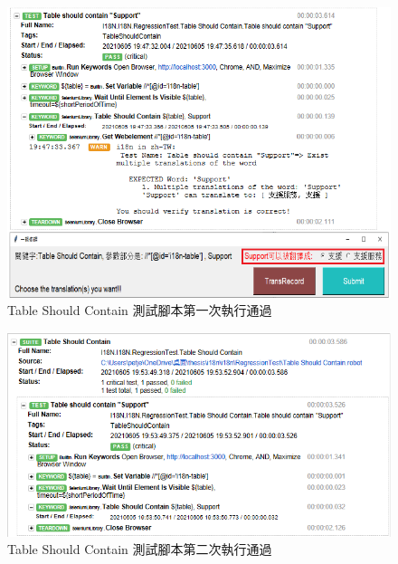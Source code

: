 \begin{figure}[H]
\includegraphics[width= \textwidth]{../論文截圖/4.1.6-2 table should contain 1st run.png}
\caption{Table Should Contain 測試腳本第一次執行通過}
\label{Table Should Contain 測試腳本第一次執行通過}
\end{figure}

\begin{figure}[H]
\includegraphics[width= \textwidth]{../論文截圖/4.1.6-3 table should contain 2nd run.png}
\caption{Table Should Contain 測試腳本第二次執行通過}
\label{Table Should Contain 測試腳本第二次執行通過}
\end{figure}

\hspace*{\fill} \\
\\ \hspace*{\fill} \\
\\ \hspace*{\fill} \\
\\ \hspace*{\fill} \\
\\ \hspace*{\fill} \\
